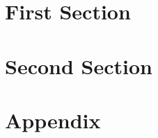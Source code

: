 \documentclass[12pt]{article}
\begin{document}
\section{First Section}
\label{sec:firstsection}


\pagebreak

\section{Second Section}
\label{sec:secondsection}


\pagebreak 

\appendix

\section{Appendix}
\label{sec:appendix}


\pagebreak



 
\end{document}
